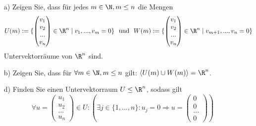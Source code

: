 \begin{itemize}
\item[a)] Zeigen Sie, dass für jedes $m \in \N, m\le n$ die Mengen
$$
U(m):= \{\begin{pmatrix} v_1 \\ v_2 \\ ... \\ v_n \end{pmatrix} \in \R^n \mid v_1,...,v_m =0 \} \ \text{ und } \ W(m) := \{\begin{pmatrix} v_1 \\ v_2 \\ ... \\ v_n \end{pmatrix} \in \R^n \mid v_{m+1},...,v_n =0 \}
$$ 
Untervektorräume von $\R^n$ sind.

\item[b)] Zeigen Sie, dass für $\forall m \in \N, m\le n$ gilt: $\langle U(m)\cup W(m) \rangle = \R^n$.

\item[d)] Finden Sie einen Untervektorraum $U \le \R^n$, sodass gilt
$$
\forall u=\begin{pmatrix} u_1 \\ u_2 \\ ... \\ u_n \end{pmatrix} \in U: ( \exists j \in \{1,...,n\}: u_j=0 \Rightarrow u=\begin{pmatrix} 0 \\ 0 \\ ... \\ 0 \end{pmatrix} )
$$
\end{itemize}



